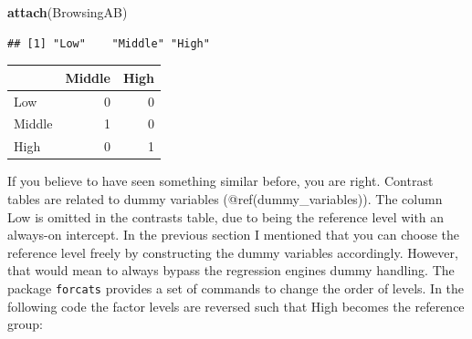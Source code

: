 \documentclass[]{svmono}
\newenvironment{Shaded}{\begin{snugshade}}{\end{snugshade}}
\newcommand{\KeywordTok}[1]{\textcolor[rgb]{0.13,0.29,0.53}{\textbf{#1}}}
\newcommand{\DataTypeTok}[1]{\textcolor[rgb]{0.13,0.29,0.53}{#1}}
\newcommand{\StringTok}[1]{\textcolor[rgb]{0.31,0.60,0.02}{#1}}
\newcommand{\CommentTok}[1]{\textcolor[rgb]{0.56,0.35,0.01}{\textit{#1}}}
\newcommand{\OperatorTok}[1]{\textcolor[rgb]{0.81,0.36,0.00}{\textbf{#1}}}
\newcommand{\NormalTok}[1]{#1}
\begin{document}
\begin{Shaded}
\begin{Highlighting}[]
\KeywordTok{attach}\NormalTok{(BrowsingAB)}
\end{Highlighting}
\end{Shaded}

\begin{Shaded}
\end{Shaded}

\begin{verbatim}
## [1] "Low"    "Middle" "High"
\end{verbatim}

\begin{Shaded}
\end{Shaded}

\begin{tabular}{l|r|r}
\hline
  & Middle & High\\
\hline
Low & 0 & 0\\
\hline
Middle & 1 & 0\\
\hline
High & 0 & 1\\
\hline
\end{tabular}

If you believe to have seen something similar before, you are right.
Contrast tables are related to dummy variables (@ref(dummy\_variables)).
The column Low is omitted in the contrasts table, due to being the
reference level with an always-on intercept. In the previous section I
mentioned that you can choose the reference level freely by constructing
the dummy variables accordingly. However, that would mean to always
bypass the regression engines dummy handling. The package
\texttt{forcats} provides a set of commands to change the order of
levels. In the following code the factor levels are reversed such that
High becomes the reference group:

\begin{Shaded}
\end{Shaded}
\end{document}
